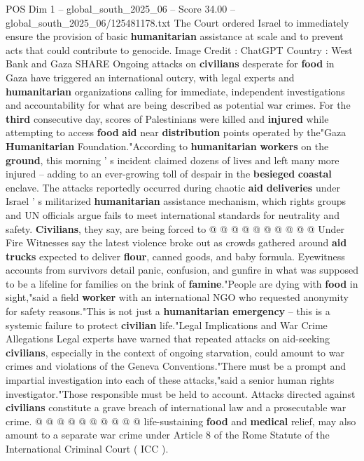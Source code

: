 \begin{textsample}{POS Dim 1 – global\_south\_2025\_06 – Score 34.00 – global\_south\_2025\_06/125481178.txt}  \label{ex:f1_pos_134}
The Court ordered Israel to immediately ensure the provision of basic \textbf{humanitarian} assistance at scale and to prevent acts that could contribute to genocide.
Image Credit : ChatGPT Country : West Bank and Gaza SHARE Ongoing attacks on \textbf{civilians} desperate for \textbf{food} in Gaza have triggered an international outcry, with legal experts and \textbf{humanitarian} organizations calling for immediate, independent investigations and accountability for what are being described as potential war crimes.
For the \textbf{third} consecutive day, scores of Palestinians were killed and \textbf{injured} while attempting to access \textbf{food} \textbf{aid} near \textbf{distribution} points operated by the"Gaza \textbf{Humanitarian} Foundation."According to \textbf{humanitarian} \textbf{workers} on the \textbf{ground}, this morning ' s incident claimed dozens of lives and left many more injured -- adding to an ever-growing toll of despair in the \textbf{besieged} \textbf{coastal} enclave.
The attacks reportedly occurred during chaotic \textbf{aid} \textbf{deliveries} under Israel ' s militarized \textbf{humanitarian} assistance mechanism, which rights groups and UN officials argue fails to meet international standards for neutrality and safety. \textbf{Civilians}, they say, are being forced to @ @ @ @ @ @ @ @ @ @ Under Fire Witnesses say the latest violence broke out as crowds gathered around \textbf{aid} \textbf{trucks} expected to deliver \textbf{flour}, canned goods, and baby formula.
Eyewitness accounts from survivors detail panic, confusion, and gunfire in what was supposed to be a lifeline for families on the brink of \textbf{famine}."People are dying with \textbf{food} in sight,"said a field \textbf{worker} with an international NGO who requested anonymity for safety reasons."This is not just a \textbf{humanitarian} \textbf{emergency} -- this is a systemic failure to protect \textbf{civilian} life."Legal Implications and War Crime Allegations Legal experts have warned that repeated attacks on aid-seeking \textbf{civilians}, especially in the context of ongoing starvation, could amount to war crimes and violations of the Geneva Conventions."There must be a prompt and impartial investigation into each of these attacks,"said a senior human rights investigator."Those responsible must be held to account.
Attacks directed against \textbf{civilians} constitute a grave breach of international law and a prosecutable war crime. @ @ @ @ @ @ @ @ @ @ life-sustaining \textbf{food} and \textbf{medical} relief, may also amount to a separate war crime under Article 8 of the Rome Statute of the International Criminal Court ( ICC ).

\end{textsample}
